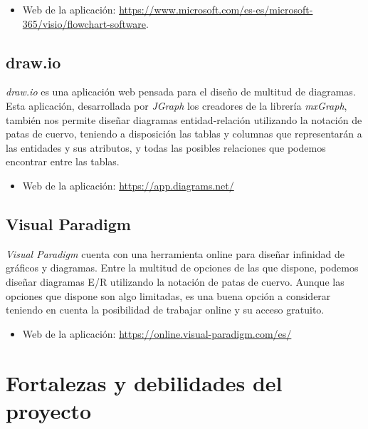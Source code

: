 \begin{itemize}
    \item Web de la aplicación: \url{https://www.microsoft.com/es-es/microsoft-365/visio/flowchart-software}.
\end{itemize}

\subsection{draw.io}
\emph{draw.io} es una aplicación web pensada para el diseño de multitud de diagramas. Esta aplicación, desarrollada por \emph{JGraph} los creadores de la librería \emph{mxGraph}, también nos permite diseñar diagramas entidad-relación utilizando la notación de patas de cuervo, teniendo a disposición las tablas y columnas que representarán a las entidades y sus atributos, y todas las posibles relaciones que podemos encontrar entre las tablas.

\begin{itemize}
    \item Web de la aplicación: \url{https://app.diagrams.net/}
\end{itemize}

\subsection{Visual Paradigm}
\emph{Visual Paradigm} cuenta con una herramienta online para diseñar infinidad de gráficos y diagramas. Entre la multitud de opciones de las que dispone, podemos diseñar diagramas E/R utilizando la notación de patas de cuervo. Aunque las opciones que dispone son algo limitadas, es una buena opción a considerar teniendo en cuenta la posibilidad de trabajar online y su acceso gratuito.

\begin{itemize}
    \item Web de la aplicación: \url{https://online.visual-paradigm.com/es/}
\end{itemize}

\section{Fortalezas y debilidades del proyecto}
